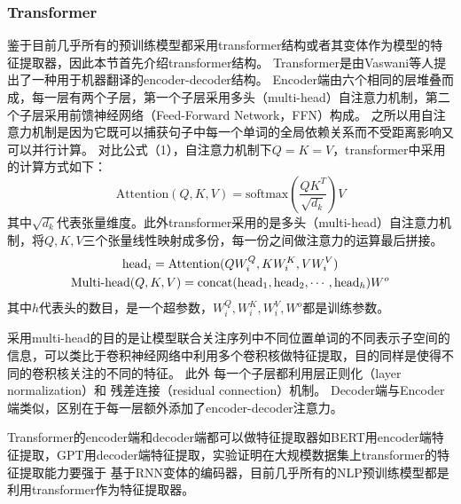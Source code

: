 \subsubsection{Transformer}\label{transformer}
鉴于目前几乎所有的预训练模型都采用transformer结构或者其变体作为模型的特征提取器，因此本节首先介绍transformer结构。
Transformer是由Vaswani等人提出了一种用于机器翻译的encoder-decoder结构。
Encoder端由六个相同的层堆叠而成，每一层有两个子层，第一个子层采用多头（multi-head）自注意力机制，第二个子层采用前馈神经网络（Feed-Forward Network，FFN）构成。
之所以用自注意力机制是因为它既可以捕获句子中每一个单词的全局依赖关系而不受距离影响又可以并行计算。
对比公式（1），自注意力机制下$Q=K=V$，transformer中采用的计算方式如下：
\begin{equation}
\text{Attention}(Q,K,V)=\text{softmax}(\frac{QK^T}{\sqrt{d_k}})V
\end{equation}
其中$\sqrt{d_k}$代表张量维度。此外transformer采用的是多头（multi-head）自注意力机制，将$Q,K,V$三个张量线性映射成多份，每一份之间做注意力的运算最后拼接。
\begin{gather}
	\text{head}_i=\text{Attention}(QW_i^Q,KW_i^K,VW_i^V) \notag \\
	\text{Multi-head}(Q,K,V)=\text{concat}(\text{head}_1,\text{head}_2,\cdots,\text{head}_h)W^o
\end{gather}
其中$h$代表头的数目，是一个超参数，$W_i^Q,W_i^K,W_i^V,W^o$都是训练参数。

采用multi-head的目的是让模型联合关注序列中不同位置单词的不同表示子空间的信息，可以类比于卷积神经网络中利用多个卷积核做特征提取，目的同样是使得不同的卷积核关注的不同的特征。
此外
每一个子层都利用层正则化（layer normalization）和
残差连接（residual connection）机制。
Decoder端与Encoder端类似，区别在于每一层额外添加了encoder-decoder注意力。

Transformer的encoder端和decoder端都可以做特征提取器如BERT用encoder端特征提取，GPT用decoder端特征提取，实验证明在大规模数据集上transformer的特征提取能力要强于
基于RNN变体的编码器，目前几乎所有的NLP预训练模型都是利用transformer作为特征提取器。


